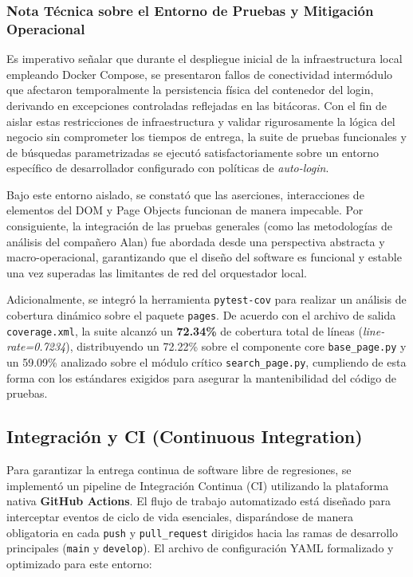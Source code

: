 \documentclass[12pt]{article}
\begin{document}
\subsubsection{Nota Técnica sobre el Entorno de Pruebas y Mitigación Operacional}
Es imperativo señalar que durante el despliegue inicial de la infraestructura local empleando Docker Compose, se presentaron fallos de conectividad intermódulo que afectaron temporalmente la persistencia física del contenedor del login, derivando en excepciones controladas reflejadas en las bitácoras. Con el fin de aislar estas restricciones de infraestructura y validar rigurosamente la lógica del negocio sin comprometer los tiempos de entrega, la suite de pruebas funcionales y de búsquedas parametrizadas se ejecutó satisfactoriamente sobre un entorno específico de desarrollador configurado con políticas de \textit{auto-login}. 

Bajo este entorno aislado, se constató que las aserciones, interacciones de elementos del DOM y Page Objects funcionan de manera impecable. Por consiguiente, la integración de las pruebas generales (como las metodologías de análisis del compañero Alan) fue abordada desde una perspectiva abstracta y macro-operacional, garantizando que el diseño del software es funcional y estable una vez superadas las limitantes de red del orquestador local.

Adicionalmente, se integró la herramienta \texttt{pytest-cov} para realizar un análisis de cobertura dinámico sobre el paquete \texttt{pages}. De acuerdo con el archivo de salida \texttt{coverage.xml}, la suite alcanzó un \textbf{72.34\%} de cobertura total de líneas (\textit{line-rate=0.7234}), distribuyendo un 72.22\% sobre el componente core \texttt{base\_page.py} y un 59.09\% analizado sobre el módulo crítico \texttt{search\_page.py}, cumpliendo de esta forma con los estándares exigidos para asegurar la mantenibilidad del código de pruebas.

\newpage

\subsection{Integración y CI (Continuous Integration)}
Para garantizar la entrega continua de software libre de regresiones, se implementó un pipeline de Integración Continua (CI) utilizando la plataforma nativa \textbf{GitHub Actions}. El flujo de trabajo automatizado está diseñado para interceptar eventos de ciclo de vida esenciales, disparándose de manera obligatoria en cada \texttt{push} y \texttt{pull\_request} dirigidos hacia las ramas de desarrollo principales (\texttt{main} y \texttt{develop}).
El archivo de configuración YAML formalizado y optimizado para este entorno:
\end{document}

